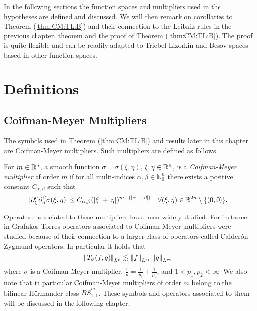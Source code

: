 In the following sections the function spaces and multipliers used in the hypotheses are defined and discussed. We will then remark on corollaries to Theorem (\ref{thm:CM:TL:B}) and their connection to the Leibniz rules in the previous chapter.  theorem and the proof of Theorem (\ref{thm:CM:TL:B}). The proof is quite flexible and can be readily adapted to Triebel-Lizorkin and Besov spaces based in other function spaces. 

\section{Definitions}

\subsection{Coifman-Meyer Multipliers}

The symbols used in Theorem (\ref{thm:CM:TL:B}) and results later in this chapter are Coifman-Meyer multipliers. Such multipliers are defined as follows.

\begin{dfn}\label{CM_def}
For $m\in{{\mathbb R}^n}$, a smooth function $\sigma = \sigma(\xi,\eta)$, $\xi,\eta\in{{\mathbb R}^n}$, is a \textit{Coifman-Meyer multiplier} of order $m$ if for all multi-indices $\alpha,\beta\in\mathbb{N}^n_0$ there exists a positive constant $C_{\alpha,\beta}$ such that 
\begin{equation}\label{eq:CMm}
|\partial_\xi^\alpha \partial_\eta^\beta \sigma(\xi, \eta)| \leq C_{\alpha, \beta} (|\xi|+|\eta|)^{m -(\left\vert \alpha \right\vert+ \left\vert \beta \right\vert)} \quad \forall (\xi, \eta) \in \mathbb{R}^{2n} \setminus \{(0,0)\}.
\end{equation}
\end{dfn}
Operators associated to these multipliers have been widely studied. For instance in Grafakos-Torres \cite{MR1880324} operators associated to Coifman-Meyer multipliers were studied because of their connection to a larger class of operators called Calder\'on-Zygmund operators. In particular it holds that 
\[ \left\|T_\sigma(f,g)\right\|_{L^p}\lesssim \left\|f\right\|_{L^{p_1}}\left\|g\right\|_{L^{p_2}} \]
where $\sigma$ is a Coifman-Meyer multiplier, $\frac{1}{p} = \frac{1}{p_1} + \frac{1}{p_2}$, and $1<p_1,p_2<\infty$. 
We also note that in particular Coifman-Meyer multipliers of order $m$ belong to the bilinear H\"ormander class $\dot{BS}^m_{1,1}$. These symbols and operators associated to them will be discussed in the following chapter. 

